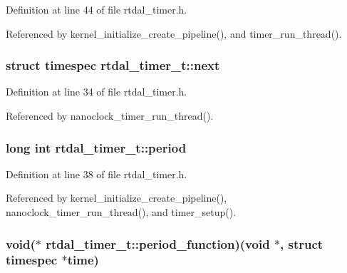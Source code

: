 Definition at line 44 of file rtdal\-\_\-timer.\-h.



Referenced by kernel\-\_\-initialize\-\_\-create\-\_\-pipeline(), and timer\-\_\-run\-\_\-thread().

\hypertarget{structrtdal__timer__t_a1224d0ece56f943b6afe4d7a5d8124a7}{
\subsubsection[{next}]{\setlength{\rightskip}{0pt plus 5cm}struct timespec rtdal\-\_\-timer\-\_\-t\-::next}}\label{structrtdal__timer__t_a1224d0ece56f943b6afe4d7a5d8124a7}


Definition at line 34 of file rtdal\-\_\-timer.\-h.



Referenced by nanoclock\-\_\-timer\-\_\-run\-\_\-thread().

\hypertarget{structrtdal__timer__t_a289e83fa067430617d384467265df41e}{
\subsubsection[{period}]{\setlength{\rightskip}{0pt plus 5cm}long int rtdal\-\_\-timer\-\_\-t\-::period}}\label{structrtdal__timer__t_a289e83fa067430617d384467265df41e}


Definition at line 38 of file rtdal\-\_\-timer.\-h.



Referenced by kernel\-\_\-initialize\-\_\-create\-\_\-pipeline(), nanoclock\-\_\-timer\-\_\-run\-\_\-thread(), and timer\-\_\-setup().

\hypertarget{structrtdal__timer__t_a9e202cbf4ae2d7a24c3e956d9dd0cc48}{
\subsubsection[{period\-\_\-function}]{\setlength{\rightskip}{0pt plus 5cm}void($\ast$ rtdal\-\_\-timer\-\_\-t\-::period\-\_\-function)(void $\ast$, struct timespec $\ast$time)}}\label{structrtdal__timer__t_a9e202cbf4ae2d7a24c3e956d9dd0cc48}



